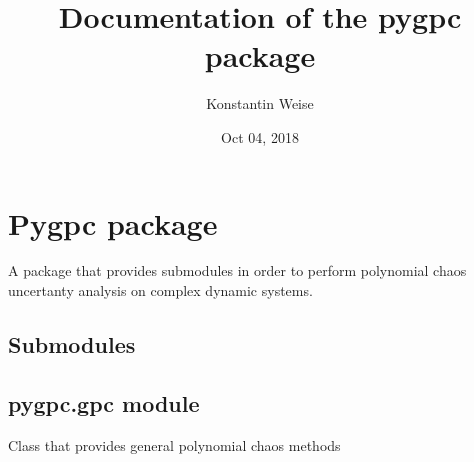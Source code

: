 \documentclass[letterpaper,10pt,english,openany,oneside]{sphinxmanual}
\title{Documentation of the pygpc package}
\date{Oct 04, 2018}
\author{Konstantin Weise}
\begin{document}
\pagestyle{empty}
\maketitle
\pagestyle{plain}
\sphinxtableofcontents
\pagestyle{normal}
\label{\detokenize{index::doc}}



\chapter{Pygpc package}
\label{\detokenize{pygpc:module-pygpc}}\label{\detokenize{pygpc:pygpc-package}}\label{\detokenize{pygpc::doc}}
A package that provides submodules in order to perform polynomial chaos uncertanty analysis on complex dynamic systems.


\section{Submodules}
\label{\detokenize{pygpc:submodules}}

\section{pygpc.gpc module}
\label{\detokenize{pygpc:module-pygpc.gpc}}\label{\detokenize{pygpc:pygpc-gpc-module}}
Class that provides general polynomial chaos methods
\end{document}
